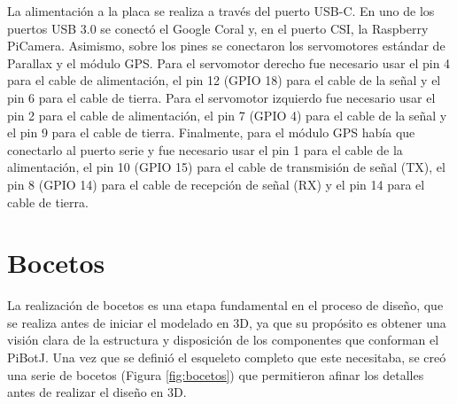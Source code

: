 La alimentación a la placa se realiza a través del puerto USB-C. En uno de los puertos USB 3.0 se conectó el Google Coral y, en el puerto CSI, la Raspberry PiCamera. Asimismo, sobre los pines se conectaron los servomotores estándar de Parallax y el módulo GPS. Para el servomotor derecho fue necesario usar el pin 4 para el cable de alimentación, el pin 12 (GPIO 18) para el cable de la señal y el pin 6 para el cable de tierra. Para el servomotor izquierdo fue necesario usar el pin 2 para el cable de alimentación, el pin 7 (GPIO 4) para el cable de la señal y el pin 9 para el cable de tierra. Finalmente, para el módulo GPS había que conectarlo al puerto serie y fue necesario usar el pin 1 para el cable de la alimentación, el pin 10 (GPIO 15) para el cable de transmisión de señal (TX), el pin 8 (GPIO 14) para el cable de recepción de señal (RX) y el pin 14 para el cable de tierra. 

 
\section{Bocetos}
\label{sec:bocetos}

La realización de bocetos es una etapa fundamental en el proceso de diseño, que se realiza antes de iniciar el modelado en 3D, ya que su propósito es obtener una visión clara de la estructura y disposición de los componentes que conforman el PiBotJ. Una vez que se definió el esqueleto completo que este necesitaba, se creó una serie de bocetos (Figura \ref{fig:bocetos}) que permitieron afinar los detalles antes de realizar el diseño en 3D.


